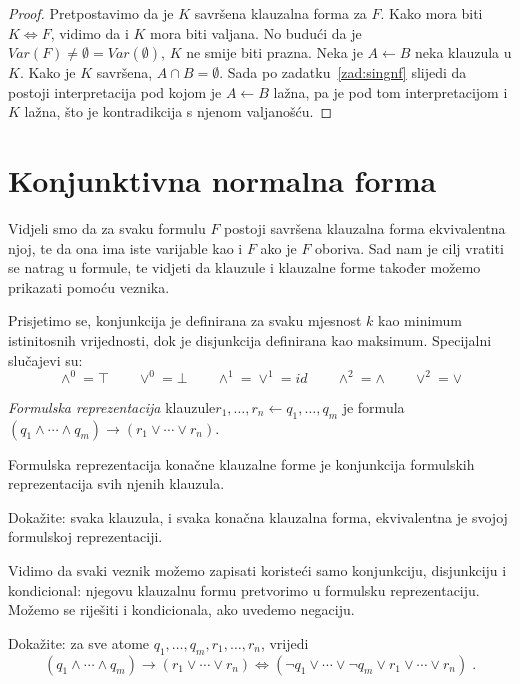 \begin{proof}
Pretpostavimo da je $K$ savršena klauzalna forma za $F$. Kako mora biti $K\Leftrightarrow F$, vidimo da i $K$ mora biti valjana. No budući da je $Var(F)\not=\emptyset=Var(\emptyset)$, $K$ ne smije biti prazna. Neka je $A\leftarrow B$ neka klauzula u $K$. Kako je $K$ savršena, $A\cap B=\emptyset$. Sada po zadatku~\ref{zad:singnf} slijedi da postoji interpretacija pod kojom je $A\leftarrow B$ lažna, pa je pod tom interpretacijom i $K$ lažna, što je kontradikcija s njenom valjanošću.
\end{proof}

\section{Konjunktivna normalna forma}

Vidjeli smo da za svaku formulu $F$ postoji savršena klauzalna forma ekvivalentna njoj, te da ona ima iste varijable kao i $F$ ako je $F$ oboriva. Sad nam je cilj vratiti se natrag u formule, te vidjeti da klauzule i klauzalne forme također možemo prikazati pomoću veznika.

Prisjetimo se, konjunkcija je definirana za svaku mjesnost $k$ kao minimum istinitosnih vrijednosti, dok je disjunkcija definirana kao maksimum. Specijalni slučajevi su:
$$\wedge^0=\top\qquad\vee^0=\bot\qquad\wedge^1=\vee^1=id\qquad\wedge^2=\wedge\qquad\vee^2=\vee$$

\begin{definicija}
\emph{Formulska reprezentacija} klauzule\newline $r_1,\ldots,r_n\leftarrow q_1,\ldots,q_m$ je formula $(q_1\wedge\cdots\wedge q_m)\to(r_1\vee\cdots\vee r_n)$.

Formulska reprezentacija konačne klauzalne forme je konjunkcija formulskih reprezentacija svih njenih klauzula.
\end{definicija}

\begin{zadatak}\label{zad:clfeqfr}
Dokažite: svaka klauzula, i svaka konačna klauzalna forma, ekvivalentna je svojoj formulskoj reprezentaciji.
\end{zadatak}

Vidimo da svaki veznik možemo zapisati koristeći samo konjunkciju, disjunkciju i kondicional: njegovu klauzalnu formu pretvorimo u formulsku reprezentaciju. Možemo se riješiti i kondicionala, ako uvedemo negaciju.

\begin{zadatak}\label{zad:clfcnf}
	Dokažite: za sve atome $q_1,\ldots,q_m,r_1,\ldots,r_n$, vrijedi
	$$(q_1\wedge\cdots\wedge q_m)\to(r_1\vee\cdots\vee r_n)
	\Longleftrightarrow
	(\neg q_1\vee\cdots\vee\neg q_m\vee r_1\vee\cdots\vee r_n)\;.
	$$
\end{zadatak}


